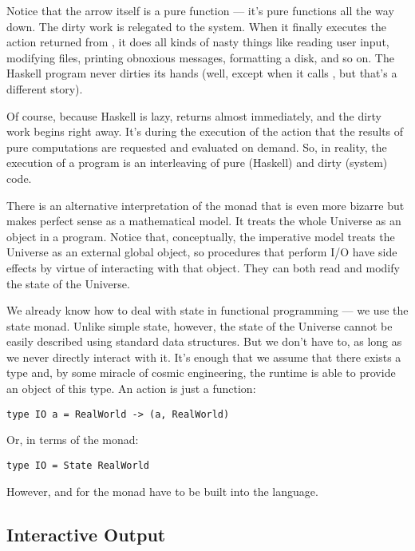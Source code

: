 Notice that the arrow itself is a pure function --- it's pure functions
all the way down. The dirty work is relegated to the system. When it
finally executes the  action returned from , it
does all kinds of nasty things like reading user input, modifying files,
printing obnoxious messages, formatting a disk, and so on. The Haskell
program never dirties its hands (well, except when it calls
, but that's a different story).

Of course, because Haskell is lazy,  returns almost
immediately, and the dirty work begins right away. It's during the
execution of the  action that the results of pure
computations are requested and evaluated on demand. So, in reality, the
execution of a program is an interleaving of pure (Haskell) and dirty
(system) code.

There is an alternative interpretation of the  monad that is
even more bizarre but makes perfect sense as a mathematical model. It
treats the whole Universe as an object in a program. Notice that,
conceptually, the imperative model treats the Universe as an external
global object, so procedures that perform I/O have side effects by
virtue of interacting with that object. They can both read and modify
the state of the Universe.

We already know how to deal with state in functional programming --- we
use the state monad. Unlike simple state, however, the state of the
Universe cannot be easily described using standard data structures. But
we don't have to, as long as we never directly interact with it. It's
enough that we assume that there exists a type  and,
by some miracle of cosmic engineering, the runtime is able to provide an
object of this type. An  action is just a function:

\begin{Verbatim}
type IO a = RealWorld -> (a, RealWorld)
\end{Verbatim}
Or, in terms of the  monad:

\begin{Verbatim}
type IO = State RealWorld
\end{Verbatim}
However, \code{>=>} and  for
the  monad have to be built into the language.

\subsection{Interactive Output}

